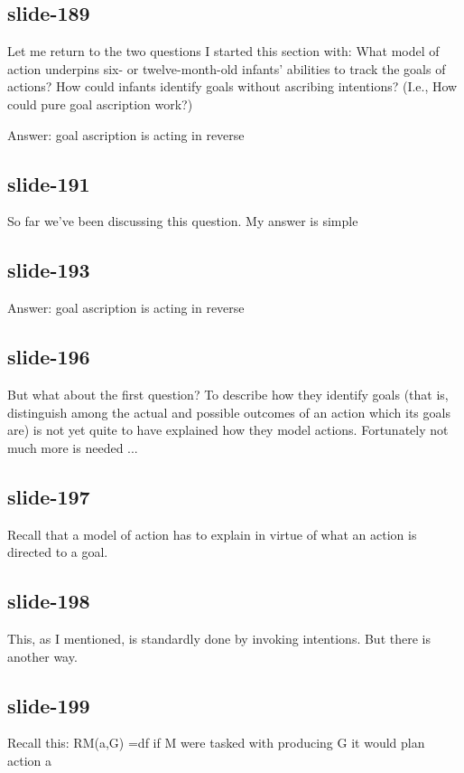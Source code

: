 \documentclass[12pt,\papersize]{extarticle}
\begin{document}
 
\subsection{slide-189}
Let me return to the two questions I started this section with:
What model of action underpins six- or twelve-month-old infants’ abilities to track the goals of actions?
How could infants identify goals without ascribing intentions?
(I.e., How could pure goal ascription work?)

Answer: goal ascription is acting in reverse

 
 
\subsection{slide-191}
So far we've been discussing this question.
My answer is simple
 
 
\subsection{slide-193}
Answer: goal ascription is acting in reverse
 
 
\subsection{slide-196}
But what about the first question? To describe how they identify goals (that is, distinguish among the actual and possible outcomes of an action which its goals are) is not yet quite to have explained how they model actions. Fortunately not much more is needed ...
 
 
\subsection{slide-197}
Recall that a model of action has to explain in virtue of what an action is directed to a goal.
 
 
\subsection{slide-198}
This, as I mentioned, is standardly done by invoking intentions. But there is another way.
 
 
\subsection{slide-199}
Recall this:
RM(a,G) =df if M were tasked with producing G it would plan action a
 
\end{document}
